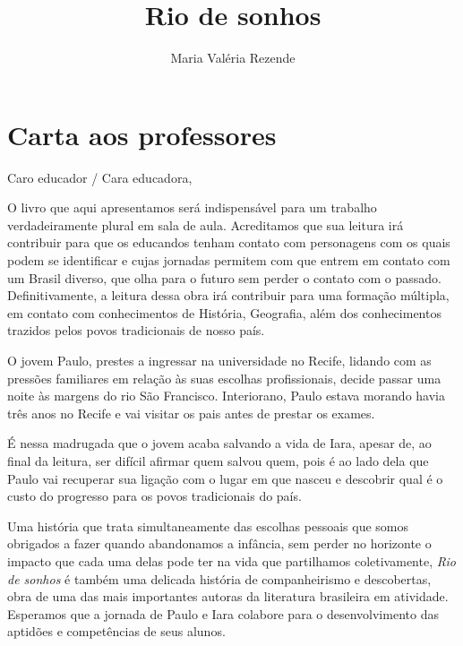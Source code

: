 \documentclass{extarticle}
\begin{document}
\newcommand{\AutorLivro}{Maria Valéria Rezende}
\newcommand{\TituloLivro}{Rio de sonhos}
\newcommand{\Tema}{Ficção, mistério e fantasia}
\newcommand{\Genero}{Romance}
\newcommand{\issnppub}{---}
\newcommand{\issnepub}{---}
\newcommand{\colaborador}{\textbf{Raphaella Lira} é uma pessoa incrível e vai fazer um bom serviço.}


\title{\TituloLivro}
\author{\AutorLivro}
\def\authornotes{\colaborador}

\date{}
\maketitle
\tableofcontents


\pagebreak

\section{Carta aos professores}

Caro educador / Cara educadora,\\\bigskip

O livro que aqui apresentamos será indispensável para um trabalho
verdadeiramente plural em sala de aula. Acreditamos que sua leitura irá
contribuir para que os educandos tenham contato com personagens com os
quais podem se identificar e cujas jornadas permitem com que entrem em
contato com um Brasil diverso, que olha para o futuro sem perder o
contato com o passado. Definitivamente, a leitura dessa obra irá
contribuir para uma formação múltipla, em contato com conhecimentos de
História, Geografia, além dos conhecimentos trazidos pelos povos
tradicionais de nosso país.

O jovem Paulo, prestes a ingressar na universidade no Recife, lidando
com as pressões familiares em relação às suas escolhas profissionais,
decide passar uma noite às margens do rio São Francisco. Interiorano,
Paulo estava morando havia três anos no Recife e vai visitar os pais
antes de prestar os exames.

É nessa madrugada que o jovem acaba salvando a vida de Iara, apesar de,
ao final da leitura, ser difícil afirmar quem salvou quem, pois é ao
lado dela que Paulo vai recuperar sua ligação com o lugar em que nasceu
e descobrir qual é o custo do progresso para os povos tradicionais do
país.

Uma história que trata simultaneamente das escolhas pessoais que somos
obrigados a fazer quando abandonamos a infância, sem perder no horizonte
o impacto que cada uma delas pode ter na vida que partilhamos
coletivamente, \emph{Rio de sonhos} é também uma delicada história de
companheirismo e descobertas, obra de uma das mais importantes autoras
da literatura brasileira em atividade. Esperamos que a jornada de Paulo
e Iara colabore para o desenvolvimento das aptidões e competências de
seus alunos.
\end{document}
